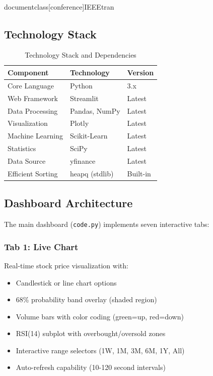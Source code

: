 \\documentclass[conference]{IEEEtran}
\begin{document}
\subsection{Technology Stack}

\begin{table}[H]
\caption{Technology Stack and Dependencies}
\begin{center}
\begin{tabular}{|l|l|l|}
\hline
\textbf{Component} & \textbf{Technology} & \textbf{Version} \\
\hline
Core Language & Python & 3.x \\
\hline
Web Framework & Streamlit & Latest \\
\hline
Data Processing & Pandas, NumPy & Latest \\
\hline
Visualization & Plotly & Latest \\
\hline
Machine Learning & Scikit-Learn & Latest \\
\hline
Statistics & SciPy & Latest \\
\hline
Data Source & yfinance & Latest \\
\hline
Efficient Sorting & heapq (stdlib) & Built-in \\
\hline
\end{tabular}
\label{tab:tech}
\end{center}
\end{table}

\subsection{Dashboard Architecture}

The main dashboard (\texttt{code.py}) implements seven interactive tabs:

\subsubsection{Tab 1: Live Chart}
Real-time stock price visualization with:
\begin{itemize}
    \item Candlestick or line chart options
    \item 68\% probability band overlay (shaded region)
    \item Volume bars with color coding (green=up, red=down)
    \item RSI(14) subplot with overbought/oversold zones
    \item Interactive range selectors (1W, 1M, 3M, 6M, 1Y, All)
    \item Auto-refresh capability (10-120 second intervals)
\end{itemize}
\end{document}
